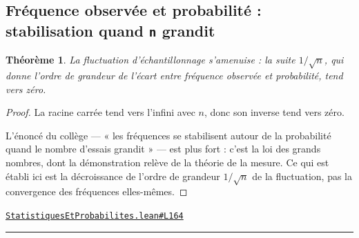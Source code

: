 \documentclass[11pt,a4paper]{article}
\theoremstyle{definition}
\theoremstyle{plain}
\newtheorem{theoreme}{Théorème}
\newcommand{\source}[2]{\par\smallskip\noindent\hfill{\footnotesize\href{#1}{\texttt{#2}}}\par\smallskip}
\begin{document}
\subsection{Fréquence observée et probabilité : stabilisation quand \texttt{n} grandit}

\begin{theoreme}
La fluctuation d'échantillonnage s'amenuise : la suite $1/\sqrt{n}$, qui donne l'ordre
de grandeur de l'écart entre fréquence observée et probabilité, tend vers zéro.
\end{theoreme}

\begin{proof}
La racine carrée tend vers l'infini avec $n$, donc son inverse tend vers zéro.

L'énoncé du collège — « les fréquences se stabilisent autour de la probabilité quand le
nombre d'essais grandit » — est plus fort : c'est la loi des grands nombres, dont la
démonstration relève de la théorie de la mesure. Ce qui est établi ici est la décroissance
de l'ordre de grandeur $1/\sqrt{n}$ de la fluctuation, pas la convergence des fréquences
elles-mêmes.
\end{proof}
\source{https://github.com/Commutator-IO/learn-lean/blob/main/cours/01-college/06-statistiques-et-probabilites/StatistiquesEtProbabilites.lean\#L164}{StatistiquesEtProbabilites.lean\#L164}

\vfill
\noindent\rule{0.35\linewidth}{0.4pt}\par
{}
\end{document}
